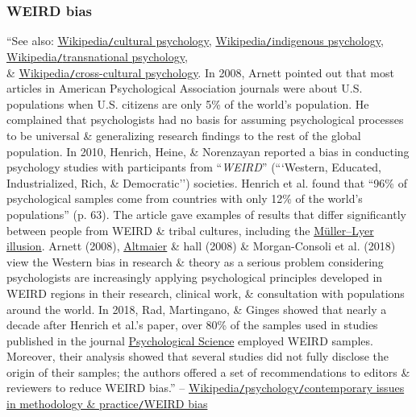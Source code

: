 \documentclass[oneside]{book}
\numberwithin{equation}{section}
\begin{document}
\subsubsection{WEIRD bias}
``See also: \href{https://en.wikipedia.org/wiki/Cultural_psychology}{Wikipedia\texttt{/}cultural psychology}, \href{https://en.wikipedia.org/wiki/Indigenous_psychology}{Wikipedia\texttt{/}indigenous psychology}, \href{https://en.wikipedia.org/wiki/Transnational_psychology}{Wikipedia\texttt{/}transnational psychology},\\\& \href{https://en.wikipedia.org/wiki/Cross-cultural_psychology}{Wikipedia\texttt{/}cross-cultural psychology}. In 2008, Arnett pointed out that most articles in American Psychological Association journals were about U.S. populations when U.S. citizens are only 5\% of the world's population. He complained that psychologists had no basis for assuming psychological processes to be universal \& generalizing research findings to the rest of the global population. In 2010, Henrich, Heine, \& Norenzayan reported a bias in conducting psychology studies with participants from ``\textit{WEIRD}'' (```Western, Educated, Industrialized, Rich, \& Democratic'') societies. Henrich et al. found that ``96\% of psychological samples come from countries with only 12\% of the world's populations'' (p. 63). The article gave examples of results that differ significantly between people from WEIRD \& tribal cultures, including the \href{https://en.wikipedia.org/wiki/M%C3%BCller-Lyer_illusion}{M\"uller--Lyer illusion}. Arnett (2008), \href{https://en.wikipedia.org/wiki/Elizabeth_Altmaier}{Altmaier} \& hall (2008) \& Morgan-Consoli et al. (2018) view the Western bias in research \& theory as a serious problem considering psychologists are increasingly applying psychological principles developed in WEIRD regions in their research, clinical work, \& consultation with populations around the world. In 2018, Rad, Martingano, \& Ginges showed that nearly a decade after Henrich et al.'s paper, over 80\% of the samples used in studies published in the journal \href{https://en.wikipedia.org/wiki/Psychological_Science}{Psychological Science} employed WEIRD samples. Moreover, their analysis showed that several studies did not fully disclose the origin of their samples; the authors offered a set of recommendations to editors \& reviewers to reduce WEIRD bias.'' -- \href{https://en.wikipedia.org/wiki/Psychology#WEIRD_bias}{Wikipedia\texttt{/}psychology\texttt{/}contemporary issues in methodology \& practice\texttt{/}WEIRD bias}
\end{document}
